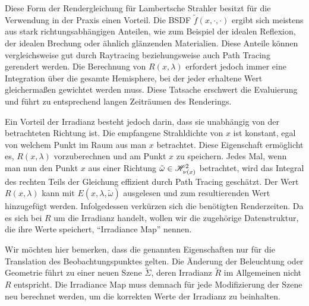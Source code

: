 		Diese Form der Rendergleichung für Lambertsche Strahler besitzt für die Verwendung in der Praxis einen Vorteil.
		Die BSDF $\tilde{f}(x,\cdot,\cdot)$ ergibt sich meistens aus stark richtungsabhängigen Anteilen, wie zum Beispiel der idealen Reflexion, der idealen Brechung oder ähnlich glänzenden Materialien.
		Diese Anteile können vergleichsweise gut durch Raytracing beziehungsweise auch Path Tracing gerendert werden.
		Die Berechnung von $R(x,\lambda)$ erfordert jedoch immer eine Integration über die gesamte Hemisphere, bei der jeder erhaltene Wert gleichermaßen gewichtet werden muss.
		Diese Tatsache erschwert die Evaluierung und führt zu entsprechend langen Zeiträumen des Renderings.

		Ein Vorteil der Irradianz besteht jedoch darin, dass sie unabhängig von der betrachteten Richtung ist.
		Die empfangene Strahldichte von $x$ ist konstant, egal von welchem Punkt im Raum aus man $x$ betrachtet.
		Diese Eigenschaft ermöglicht es, $R(x,\lambda)$ vorzuberechnen und am Punkt $x$ zu speichern.
		Jedes Mal, wenn man nun den Punkt $x$ aus einer Richtung $\tilde{\omega}\in\mathscr{H}^{2}_{\nu(x)}$ betrachtet, wird das Integral des rechten Teils der Gleichung effizient durch Path Tracing geschätzt. Der Wert $R(x,\lambda)$ kann mit $E(x,\lambda,\tilde{\omega})$ ausgelesen und zum resultierenden Wert hinzugefügt werden.
		Infolgedessen verkürzen sich die benötigten Renderzeiten.
		Da es sich bei $R$ um die Irradianz handelt, wollen wir die zugehörige Datenstruktur, die ihre Werte speichert, \enquote{Irradiance Map} nennen.

		Wir möchten hier bemerken, dass die genannten Eigenschaften nur für die Translation des Beobachtungspunktes gelten.
		Die Änderung der Beleuchtung oder Geometrie führt zu einer neuen Szene $\tilde{\Sigma}$, deren Irradianz $\tilde{R}$ im Allgemeinen nicht $R$ entspricht.
		Die Irradiance Map muss demnach für jede Modifizierung der Szene neu berechnet werden, um die korrekten Werte der Irradianz zu beinhalten.




